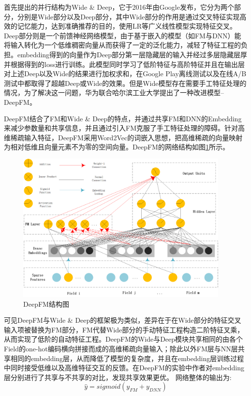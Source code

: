 首先提出的并行结构为Wide \& Deep\cite{cheng2016wide}，它于2016年由Google发布，它分为两个部分，分别是Wide部分以及Deep部分，其中Wide部分的作用是通过交叉特征实现高效的记忆能力，达到准确推荐的目的，使用LR等广义线性模型实现特征交叉。Deep部分则是一个前馈神经网络模型，由于基于嵌入的模型（如FM与DNN）能将输入转化为一个低维稠密向量从而获得了一定的泛化能力，减轻了特征工程的负担。embedding得到的向量作为Deep部分第一层隐藏层的输入并经过多层隐藏层厚并根据得到的loss进行训练。此模型同时学习了低阶特征与高阶特征并且在输出层对上述Deep以及Wide的结果进行加权求和，在Google Play离线测试以及在线A/B测试中都取得了超越Deep或Wide的效果。但是Wide模型存在需要手工特征处理的情况，为了解决这一问题，华为联合哈尔滨工业大学提出了一种改进模型--DeepFM\cite{guo2017deepfm}。

DeepFM结合了FM和Wide \& Deep的特点，并通过共享FM和DNN的Embedding来减少参数量和共享信息，并且通过引入FM克服了手工特征处理的障碍。针对高维稀疏输入特征，DeepFM采用Word2Vec的词嵌入思想，把高维稀疏的向量映射为相对低维且向量元素不为零的空间向量。DeepFM的网络结构如图\ref{DeepFM结构}所示。
\begin{figure}[htb]
  \vspace{13pt} %
  \centering
  \includegraphics[width=0.95\textwidth]{images/DeepFM.png}
  \caption{DeepFM结构图\cite{DeepFM结构图}}\label{DeepFM结构} %
\end{figure}

可见DeepFM与Wide \& Deep的框架极为类似，差异在于在Wide部分的特征交叉输入项被替换为FM部分，FM代替Wide部分的手动特征工程构造二阶特征叉乘，从而实现了低阶的自动特征工程。DeepFM的Wide与Deep模块共享相同的由各个Field的one-hot编码横向拼接而成的高维稀疏向量输入；除此以外FM层与NN层共享相同的embedding层，从而降低了模型的复杂度，并且在embedding层训练过程中同时接受低维以及高维特征交互的反馈。在DeepFM的实验中作者对embedding层分别进行了共享与不共享的对比，发现共享效果更优。
网络整体的输出为:
\begin{equation}
  \hat{y} = sigmoid(y_{FM} +y_{DNN})
\end{equation}

